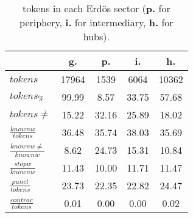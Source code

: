 \begin{table}[h!]
\begin{center}
\begin{tabular}{| l || c | c | c | c |}\hline
 & {\bf g.} & {\bf p.} & {\bf i.} & {\bf h.} \\\hline\hline
$tokens$ & 17964  & 1539  & 6064  & 10362 \\
$tokens_{\%}$ & 99.99  & 8.57  & 33.75  & 57.68 \\
$tokens \neq$ & 15.22  & 32.16  & 25.89  & 18.02 \\\hline
$\frac{knownw}{tokens}$ & 36.48  & 35.74  & 38.03  & 35.69 \\
$\frac{knownw \neq}{knownw}$ & 8.62  & 24.73  & 15.31  & 10.84 \\\hline
$\frac{stopw}{knownw}$ & 11.43  & 10.00  & 11.71  & 11.47 \\
$\frac{punct}{tokens}$ & 23.73  & 22.35  & 22.82  & 24.47 \\
$\frac{contrac}{tokens}$ & 0.01  & 0.00  & 0.00  & 0.02 \\\hline
\end{tabular}
\caption{tokens in each Erd\"os sector ({{\bf p.}} for periphery, {{\bf i.}} for intermediary, 
    {{\bf h.}} for hubs).}
\end{center}
\end{table}